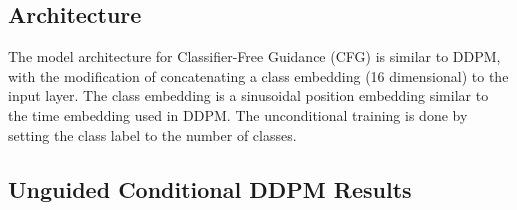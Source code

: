 \documentclass[11pt]{article}
\begin{document}
\subsection{Architecture}

The model architecture for Classifier-Free Guidance (CFG) is similar to DDPM, with the modification of concatenating a class embedding (16 dimensional) to the input layer. The class embedding is a sinusoidal position embedding similar to the time embedding used in DDPM. The unconditional training is done by setting the class label to the number of classes.

\subsection{Unguided Conditional DDPM Results}
\end{document}

